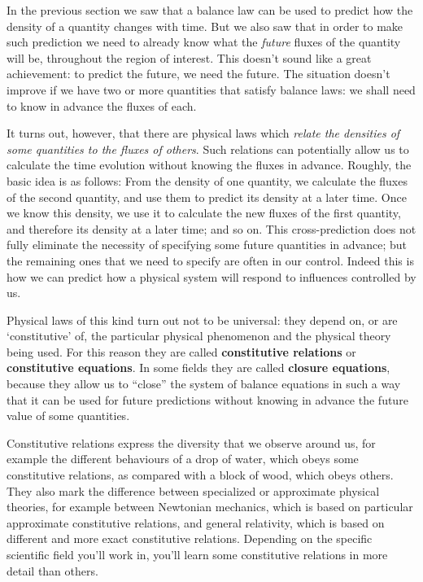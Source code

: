 \documentclass[a4paper,12pt,%
onecolumn,oneside,titlepage,%
british%
]{memoir}
\providecommand{\href}[2]{#2}
\newcommand*{\furl}[2]{\href{#1}{#2}\pagenote{\url{#1}}}
\renewcommand*{\|}[1][]{\nonscript\:#1\vert\nonscript\:\mathopen{}}
\begin{document}
In the previous section we saw that a balance law can be used to predict how the density of a quantity changes with time. But we also saw that in order to make such prediction we need to already know what the \emph{future} fluxes of the quantity will be, throughout the region of interest. This doesn't sound like a great achievement: to predict the future, we need the future. The situation doesn't improve if we have two or more quantities that satisfy balance laws: we shall need to know in advance the fluxes of each.

It turns out, however, that there are physical laws which \emph{relate the densities of some quantities to the fluxes of others}. Such relations can potentially allow us to calculate the time evolution without knowing the fluxes in advance. Roughly, the basic idea is as follows: From the density of one quantity, we calculate the fluxes of the second quantity, and use them to predict its density at a later time. Once we know this density, we use it to calculate the new fluxes of the first quantity, and therefore its density at a later time; and so on. This cross-prediction does not fully eliminate the necessity of specifying some future quantities in advance; but the remaining ones that we need to specify are often in our control. Indeed this is how we can predict how a physical system will respond to influences controlled by us.

Physical laws of this kind turn out not to be universal: they depend on, or are \furl{https://www.merriam-webster.com/dictionary/constitutive}{\enquote*{constitutive}} of, the particular physical phenomenon and the physical theory being used. For this reason they are called \textbf{constitutive relations} or \textbf{constitutive equations}. In some fields they are called \textbf{closure equations}, because they allow us to \enquote{close} the system of balance equations in such a way that it can be used for future predictions without knowing in advance the future value of some quantities.

Constitutive relations express the diversity that we observe around us, for example the different behaviours of a drop of water, which obeys some constitutive relations, as compared with a block of wood, which obeys others. They also mark the difference between specialized or approximate physical theories, for example between Newtonian mechanics, which is based on particular approximate constitutive relations, and general relativity, which is based on different and more exact constitutive relations. Depending on the specific scientific field you'll work in, you'll learn some constitutive relations in more detail than others.
\end{document}

